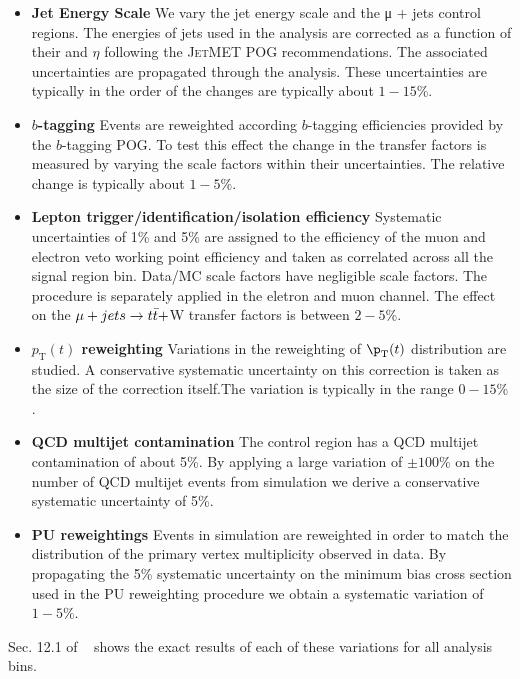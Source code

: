 \begin{itemize}
  \item{\bf Jet Energy Scale} We vary the jet energy scale \mj and \mmj the μ + jets control regions.  The energies of jets used in the analysis are corrected as a function of their \Pt and $\eta$ following the \textsc{JetMET} POG recommendations. The associated uncertainties are propagated through the analysis.
These uncertainties are typically in the order of the changes are typically about $1-15$\%.

\item{\bf $b$-tagging} Events are reweighted according $b$-tagging efficiencies provided by the $b$-tagging POG.  To test this effect the change in the transfer factors is measured by varying the scale factors within their uncertainties. The relative change is typically about $1-5$\%.

\item{\bf Lepton trigger/identification/isolation efficiency} Systematic uncertainties of 1\% and 5\% are assigned to the efficiency of the muon and electron veto working point efficiency and taken as correlated across all the signal region bin. Data/MC scale factors have negligible scale factors. The procedure is separately applied in the eletron and muon channel. The effect on the $\mu + jets \to t\bar{t} + $W transfer factors is between $2-5\%$.

\item{\bf $p_\textrm{T}(t)$ reweighting} Variations in the reweighting of $\p_\textrm{T}(t)$ distribution are studied. A conservative systematic uncertainty on this correction is taken as the size of the correction itself.The variation is typically in the range $0-15\%$.

\item{\bf QCD multijet contamination} The \gj control region has a QCD multijet contamination of about 5\%. By applying a large variation of $\pm 100\%$ on the number of QCD multijet events from simulation we derive a conservative systematic uncertainty of 5\%. 

\item{\bf PU reweightings} Events in simulation are reweighted in order to match the distribution of the primary vertex multiplicity observed in data.
By propagating the 5\% systematic uncertainty on the minimum bias cross section used in the PU reweighting procedure we obtain a systematic variation of $1-5\%$.
\end{itemize}


Sec. 12.1 of ~\cite{alphaTnote} shows the exact results of each of these variations for all analysis bins.





